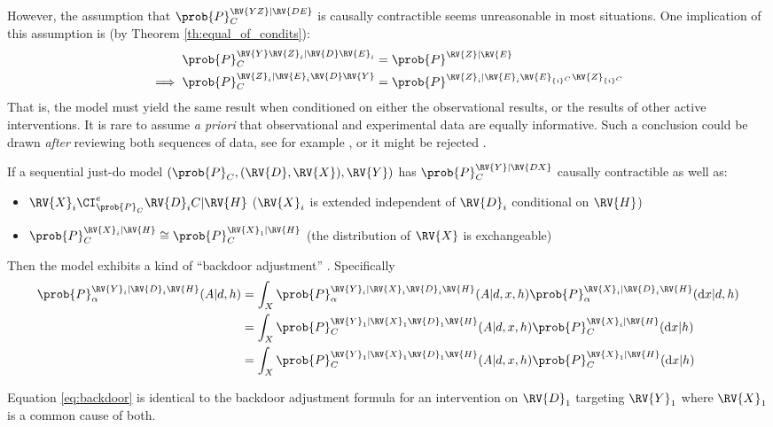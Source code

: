 However, the assumption that $\prob{P}_C^{\RV{YZ}|\RV{DE}}$ is causally contractible seems unreasonable in most situations. One implication of this assumption is (by Theorem \ref{th:equal_of_condits}):
\begin{align}
    \prob{P}^{\RV{Y}\RV{Z}_i|\RV{D}\RV{E}_i}_C &= \prob{P}^{\RV{Z}|\RV{E}}\\
    \implies \prob{P}^{\RV{Z}_i|\RV{E}_i\RV{D}\RV{Y}}_C &= \prob{P}^{\RV{Z}_{i}|\RV{E}_i\RV{E}_{\{i\}^C}\RV{Z}_{\{i\}^C}}\label{eq:interchangeability}
\end{align}
That is, the model must yield the same result when conditioned on either the observational results, or the results of other active interventions. It is rare to assume \emph{a priori} that observational and experimental data are equally informative. Such a conclusion could be drawn \emph{after} reviewing both sequences of data, see for example \citet{eckles_bias_2021}, or it might be rejected \citet{gordon_comparison_2018,gordon_close_2022}.

\begin{example}\label{ex:backdoor}
If a sequential just-do model $(\prob{P}_C,(\RV{D},\RV{X}),\RV{Y})$ has $\prob{P}_C^{\RV{Y}|\RV{DX}}$ causally contractible as well as:
\begin{itemize}
    \item $\RV{X}_{i}\CI^e_{\prob{P}_C}\RV{D}_{i}C|\RV{H}$ ($\RV{X}_i$ is extended independent of $\RV{D}_i$ conditional on $\RV{H}$)
    \item $\prob{P}_C^{\RV{X}_{i}|\RV{H}}\cong \prob{P}_C^{\RV{X}_{1}|\RV{H}}$ (the distribution of $\RV{X}$ is exchangeable)
 \end{itemize}
Then the model exhibits a kind of ``backdoor adjustment'' \citet[Chap. 1]{pearl_causality:_2009}. Specifically
\begin{align}
    \prob{P}_\alpha^{\RV{Y}_{i}|\RV{D}_{i}\RV{H}}(A|d,h) &= \int_X \prob{P}_\alpha^{\RV{Y}_{i}|\RV{X}_{i}\RV{D}_{i}\RV{H}}(A|d,x,h)\prob{P}_\alpha^{\RV{X}_{i}|\RV{D}_{i}\RV{H}}(\mathrm{d}x|d,h)\\
    &= \int_X \prob{P}_C^{\RV{Y}_{1}|\RV{X}_{1}\RV{D}_{1}\RV{H}}(A|d,x,h)\prob{P}_C^{\RV{X}_{i}|\RV{H}}(\mathrm{d}x|h)\\
    &= \int_X \prob{P}_C^{\RV{Y}_{1}|\RV{X}_{1}\RV{D}_{1}\RV{H}}(A|d,x,h)\prob{P}_C^{\RV{X}_{1}|\RV{H}}(\mathrm{d}x|h)\label{eq:backdoor}
\end{align}
\end{example}


Equation \ref{eq:backdoor} is identical to the backdoor adjustment formula for an intervention on $\RV{D}_1$ targeting $\RV{Y}_1$ where $\RV{X}_1$ is a common cause of both.


